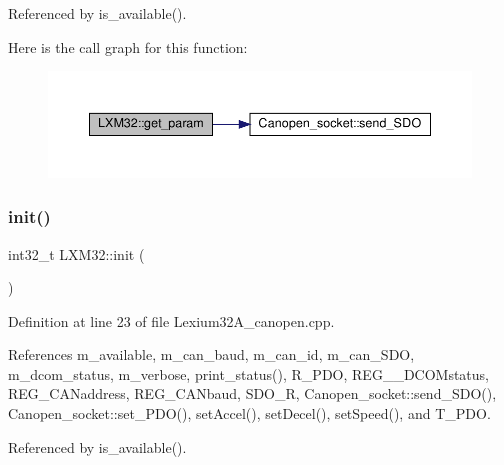 Referenced by is\+\_\+available().

Here is the call graph for this function\+:\nopagebreak
\begin{figure}[H]
\begin{center}
\leavevmode
\includegraphics[width=350pt]{class_l_x_m32_aa36cd9154a11f3388715fa2f482c37ca_cgraph}
\end{center}
\end{figure}
\mbox{\label{class_l_x_m32_a3cec01ae3a6afe61a31bfa37f7d1436d}} 
\subsubsection{\texorpdfstring{init()}{init()}}
{\footnotesize\ttfamily int32\+\_\+t L\+X\+M32\+::init (\begin{DoxyParamCaption}{ }\end{DoxyParamCaption})}



Definition at line 23 of file Lexium32\+A\+\_\+canopen.\+cpp.



References m\+\_\+available, m\+\_\+can\+\_\+baud, m\+\_\+can\+\_\+id, m\+\_\+can\+\_\+\+S\+DO, m\+\_\+dcom\+\_\+status, m\+\_\+verbose, print\+\_\+status(), R\+\_\+\+P\+DO, R\+E\+G\+\_\+\+\_\+\+D\+C\+O\+Mstatus, R\+E\+G\+\_\+\+C\+A\+Naddress, R\+E\+G\+\_\+\+C\+A\+Nbaud, S\+D\+O\+\_\+R, Canopen\+\_\+socket\+::send\+\_\+\+S\+D\+O(), Canopen\+\_\+socket\+::set\+\_\+\+P\+D\+O(), set\+Accel(), set\+Decel(), set\+Speed(), and T\+\_\+\+P\+DO.



Referenced by is\+\_\+available().

